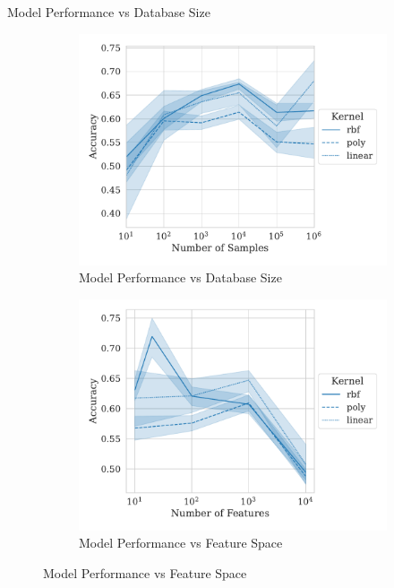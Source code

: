 \documentclass{beamer}
\begin{document}
\begin{frame}{Model Performance vs Database Size}
  \begin{figure}
    \centering
    \begin{subfigure}{.45\textwidth}
      \centering
      \includegraphics[width=\textwidth]{./generated/accuracy_vs_samples.pdf}
      \caption{Model Performance vs Database Size}
    \end{subfigure}
    \hfill
    \begin{subfigure}{.45\textwidth}
      \centering
      \includegraphics[width=\textwidth]{./generated/accuracy_vs_features.pdf}
      \caption{Model Performance vs Feature Space}
    \end{subfigure}
  \end{figure}
\end{frame}
\end{document}
